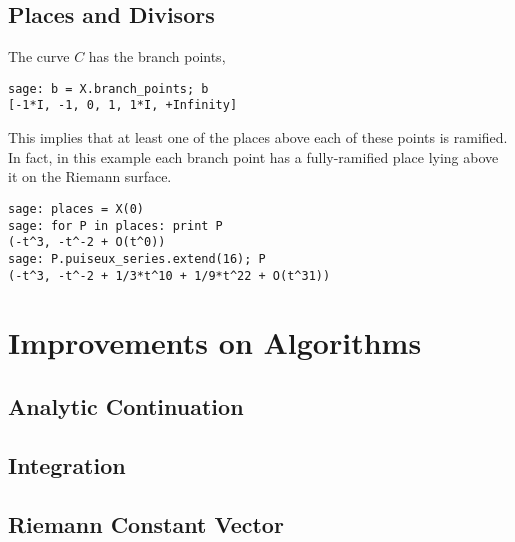 \subsection{Places and Divisors}

The curve $C$ has the branch points,

\begin{lstlisting}[language=Sage]
sage: b = X.branch_points; b
[-1*I, -1, 0, 1, 1*I, +Infinity]
\end{lstlisting}

\noindent This implies that at least one of the places above each of these
points is ramified. In fact, in this example each branch point has a
fully-ramified place lying above it on the Riemann surface.

\begin{lstlisting}[language=Sage]
sage: places = X(0)
sage: for P in places: print P
(-t^3, -t^-2 + O(t^0))
sage: P.puiseux_series.extend(16); P
(-t^3, -t^-2 + 1/3*t^10 + 1/9*t^22 + O(t^31))
\end{lstlisting}


\section{Improvements on
  Algorithms}\label{sec:abelfunctions-improvements-on-algorithms}


\subsection{Analytic
  Continuation}\label{subsec:abelfunctions-analytic-continuation}


\subsection{Integration}\label{subsec:abelfunctions-integration}


\subsection{Riemann Constant
  Vector}\label{subsec:abelfunctions-riemann-constant-vector}
